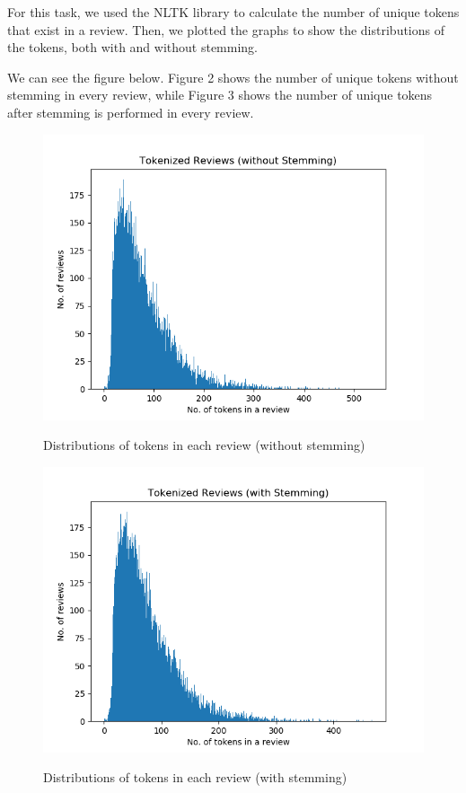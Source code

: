 For this task, we used the NLTK library to calculate the number of unique tokens that exist in a review. Then, we plotted the graphs to show the distributions of the tokens, both with and without stemming.

We can see the figure below. Figure 2 shows the number of unique tokens without stemming in every review, while Figure 3 shows the number of unique tokens after stemming is performed in every review.

\begin{figure}
    \centering
    \caption{Distributions of tokens in each review (without stemming)}
    \includegraphics[scale=0.4]{figures/token_review.png}
    \label{fig:tokenized_review}
\end{figure}

\begin{figure}
    \centering
    \caption{Distributions of tokens in each review (with stemming)}
    \includegraphics[scale=0.4]{figures/stem_review.png}
    \label{fig:stemmed_token_review}
\end{figure}


